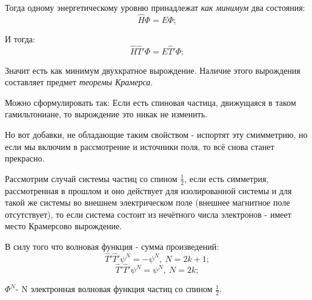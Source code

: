 \documentclass[a4paper, 14pt, russian]{article}
\newcommand{\be}{\begin{equation}}
\newcommand{\ee}{\end{equation}}
\begin{document}
	Тогда одному энергетическому уровню принадлежат \textit{как минимум}
	два состояния:
	\be
		\label{eq218}
		\hat H \Phi = E \Phi;
	\ee 

	И тогда:
	\be
		\label{eq219}
		\hat H \hat{T}' \Phi = E \hat{T}' \Phi;
	\ee 

	Значит есть как минимум двухкратное вырождение. Наличие этого вырождения
	составляет предмет \textit{теоремы Крамерса}. 

	Можно сформулировать так: Если есть спиновая частица,
	движущаяся в таком гамильтониане, то вырождение это никак не изменить.

	Но вот добавки, не обладающие таким свойством - испортят эту смимметрию, но если
	мы включим в рассмотрение и источники поля, то всё снова станет прекрасно. 

	Рассмотрим случай системы частиц со спином  $\frac{1}{2}$, если есть
	симметрия, рассмотренная в прошлом и оно действует для изолированной системы и 
	для такой же системы во внешнем электрическом поле (внешнее магнитное поле отсутствует),
	то если система состоит из нечётного числа электронов - имеет место Крамерсово
	вырождение.

	В силу того что волновая функция - сумма произведений:
	\be
		\hat{T}' \hat{T}' \psi^N = - \psi^N,~N = 2k + 1;
	\ee
	\be
		\hat{T}' \hat{T}' \psi^N = \psi^N,~N = 2k;
	\ee

	$\Phi^N$- N электронная волновая функция частиц со спином $\frac{1}{2}$.
\end{document}

